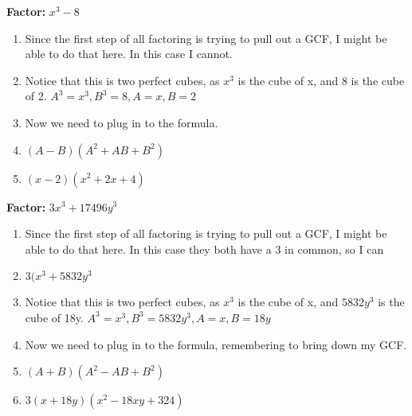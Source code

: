 \documentclass{article}
\begin{document}
\textbf{Factor:} $x^{3} - 8$\\
\begin{enumerate}
\item Since the first step of all factoring is trying to pull out a GCF, I might be able to do that here. In this case I cannot.
\item Notice that this is two perfect cubes, as $x^{3}$ is the cube of x, and 8 is the cube of 2. $A^{3}=x^{3}, B^{3}=8, A=x, B=2$
\item Now we need to plug in to the formula.
\item [] $(A-B)(A^{2}+AB+B^{2})$
\item [] $(x-2)(x^{2}+2x+4)$
\end{enumerate}
\textbf{Factor:} $3x^{3} + 17496y^{3}$\\
\begin{enumerate}
\item Since the first step of all factoring is trying to pull out a GCF, I might be able to do that here. In this case they both have a 3 in common, so I can
\item [] $3(x^{3}+5832y^{3}$
\item Notice that this is two perfect cubes, as $x^{3}$ is the cube of x, and $5832y^{3}$ is the cube of 18y. $A^{3}=x^{3}, B^{3}=5832y^{3}, A=x, B=18y$
\item Now we need to plug in to the formula, remembering to bring down my GCF.
\item [] $(A+B)(A^{2}-AB+B^{2})$
\item [] $3(x+18y)(x^{2}-18xy+324)$
\end{enumerate}
\end{document}
